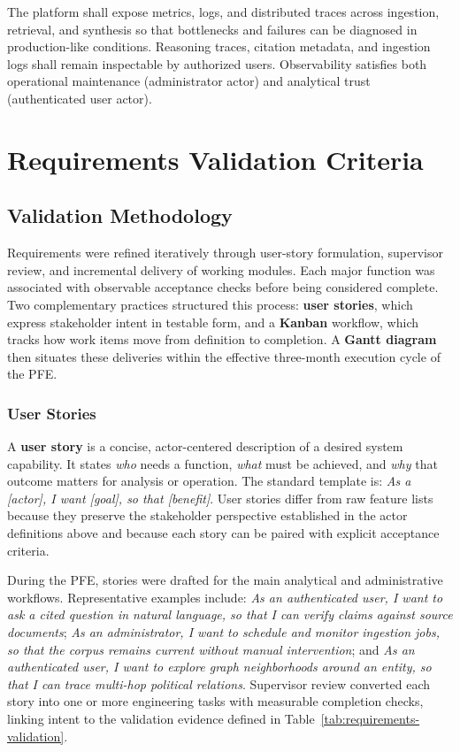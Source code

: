 The platform shall expose metrics, logs, and distributed traces across ingestion, retrieval, and synthesis so that bottlenecks and failures can be diagnosed in production-like conditions. Reasoning traces, citation metadata, and ingestion logs shall remain inspectable by authorized users. Observability satisfies both operational maintenance (administrator actor) and analytical trust (authenticated user actor).

\section{Requirements Validation Criteria}

\subsection{Validation Methodology}

Requirements were refined iteratively through user-story formulation, supervisor review, and incremental delivery of working modules. Each major function was associated with observable acceptance checks before being considered complete. Two complementary practices structured this process: \textbf{user stories}, which express stakeholder intent in testable form, and a \textbf{Kanban} workflow, which tracks how work items move from definition to completion. A \textbf{Gantt diagram} then situates these deliveries within the effective three-month execution cycle of the PFE.

\subsubsection{User Stories}

A \textbf{user story} is a concise, actor-centered description of a desired system capability. It states \emph{who} needs a function, \emph{what} must be achieved, and \emph{why} that outcome matters for analysis or operation. The standard template is: \emph{As a [actor], I want [goal], so that [benefit]}. User stories differ from raw feature lists because they preserve the stakeholder perspective established in the actor definitions above and because each story can be paired with explicit acceptance criteria.

During the PFE, stories were drafted for the main analytical and administrative workflows. Representative examples include: \emph{As an authenticated user, I want to ask a cited question in natural language, so that I can verify claims against source documents}; \emph{As an administrator, I want to schedule and monitor ingestion jobs, so that the corpus remains current without manual intervention}; and \emph{As an authenticated user, I want to explore graph neighborhoods around an entity, so that I can trace multi-hop political relations}. Supervisor review converted each story into one or more engineering tasks with measurable completion checks, linking intent to the validation evidence defined in Table~\ref{tab:requirements-validation}.

